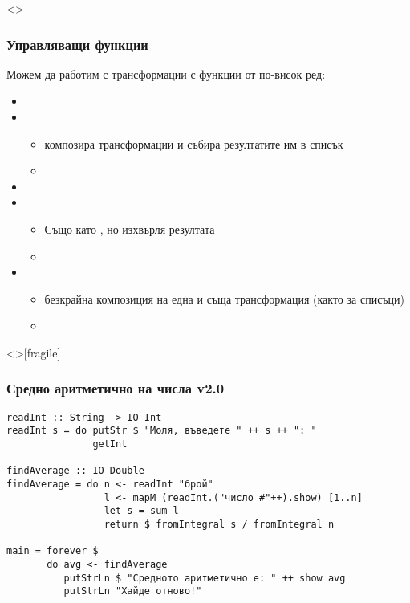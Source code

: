 \documentclass[alsotrans,beameroptions={aspectratio=169}]{beamerswitch}
\begin{document}
\begin{frame}<>
  \frametitle{Управляващи функции}

  Можем да работим с трансформации с функции от по-висок ред:
  \begin{itemize}[<+->]
  \item {}
  \item {}
    \begin{itemize}
    \item композира трансформации и събира резултатите им в списък
    \item {} %
    \end{itemize}
  \item {}
  \item {}
    \begin{itemize}
    \item Също като , но изхвърля резултата
    \item {}
    \end{itemize}
  \item {}
    \begin{itemize}
    \item безкрайна композиция на една и съща трансформация (както  за списъци)
    \item {}
    \end{itemize}
  \end{itemize}
\end{frame}

\begin{frame}<>[fragile]
  \frametitle{Средно аритметично на числа v2.0}

  \small
\begin{lstlisting}
readInt :: String -> IO Int
readInt s = do putStr $ "Моля, въведете " ++ s ++ ": "
               getInt

findAverage :: IO Double
findAverage = do n <- readInt "брой"
                 l <- mapM (readInt.("число #"++).show) [1..n]
                 let s = sum l
                 return $ fromIntegral s / fromIntegral n

main = forever $
       do avg <- findAverage
          putStrLn $ "Средното аритметично е: " ++ show avg
          putStrLn "Хайде отново!"
\end{lstlisting}
\end{frame}
\end{document}
